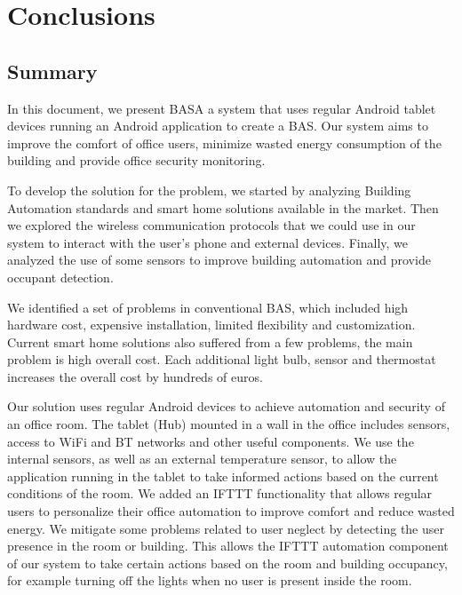\chapter{Conclusions}
\label{chapter:conclusion}

\section{Summary}
\label{section:summary}


In this document, we present BASA a system that uses regular Android tablet devices running an Android application to create a \ac{BAS}. Our system aims to improve the comfort of office users, minimize wasted energy consumption of the building and provide office security monitoring. 

To develop the solution for the problem, we started by analyzing Building Automation standards and smart home solutions available in the market. Then we explored the wireless communication protocols that we could use in our system to interact with the user's phone and external devices. Finally, we analyzed the use of some sensors to improve building automation and provide occupant detection. 

We identified a set of problems in conventional \ac{BAS}, which included high hardware cost, expensive installation, limited flexibility and customization.
Current smart home solutions also suffered from a few problems, the main problem is high overall cost. Each additional light bulb, sensor and thermostat increases the overall cost by hundreds of euros.

Our solution uses regular Android devices to achieve automation and security of an office room. The tablet (Hub) mounted in a wall in the office includes sensors, access to \ac{WiFi} and \ac{BT} networks and other useful components. We use the internal sensors, as well as an external temperature sensor, to allow the application running in the tablet to take informed actions based on the current conditions of the room. 
We added an \ac{IFTTT} functionality that allows regular users to personalize their office automation to improve comfort and reduce wasted energy. We mitigate some problems related to user neglect by detecting the user presence in the room or building. This allows the \ac{IFTTT} automation component of our system to take certain actions based on the room and building occupancy, for example turning off the lights when no user is present inside the room.


